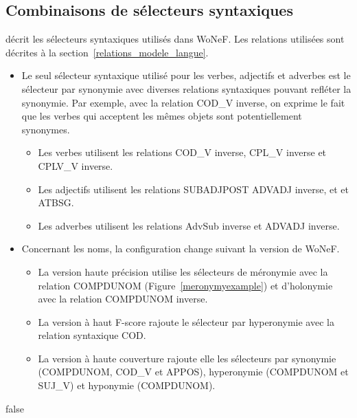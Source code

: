 \documentclass[oneside,parskip]{scrbook}
\begin{document}
\subsection{Combinaisons de sélecteurs syntaxiques}

\cite[section 3.1.1.3]{mouton2010phd} décrit les sélecteurs syntaxiques
utilisés dans WoNeF. Les relations utilisées sont décrites à la
section~\ref{relations_modele_langue}.

\begin{itemize}
    \item Le seul sélecteur syntaxique utilisé pour les verbes, adjectifs et
        adverbes est le sélecteur par synonymie avec diverses relations
        syntaxiques pouvant refléter la synonymie. Par exemple, avec la
        relation COD\_V inverse, on exprime le fait que les verbes qui acceptent
        les mêmes objets sont potentiellement synonymes.
        \begin{itemize}
            \item Les verbes utilisent les relations COD\_V inverse, CPL\_V
                inverse et CPLV\_V inverse.
            \item Les adjectifs utilisent les relations SUBADJPOST ADVADJ
                inverse, et et ATBSG.
            \item Les adverbes utilisent les relations AdvSub inverse et ADVADJ
                inverse.
        \end{itemize}
    \item Concernant les noms, la configuration change suivant la version de WoNeF.
        \begin{itemize}
            \item La version haute précision utilise les sélecteurs de
                méronymie avec la relation COMPDUNOM
                (Figure~\ref{meronymyexample}) et d'holonymie avec la relation
                COMPDUNOM inverse.
            \item La version à haut F-score rajoute le sélecteur par
                hyperonymie avec la relation syntaxique COD.
            \item La version à haute couverture rajoute elle les sélecteurs
                par synonymie (COMPDUNOM, COD\_V et APPOS), hyperonymie
                (COMPDUNOM et SUJ\_V) et hyponymie (COMPDUNOM).
        \end{itemize}
\end{itemize}

\if false
\end{document}
